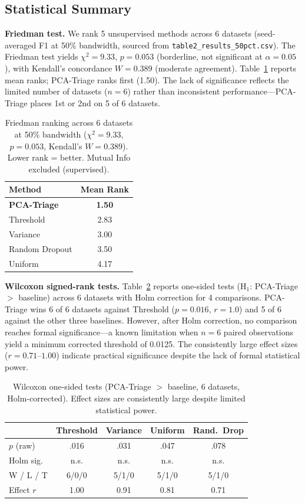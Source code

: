 \documentclass[journal]{IEEEtran}
\begin{document}
\subsection{Statistical Summary}

\textbf{Friedman test.} We rank 5 unsupervised methods across 6 datasets (seed-averaged F1 at 50\% bandwidth, sourced from \texttt{table2\_results\_50pct.csv}). The Friedman test yields $\chi^2 = 9.33$, $p = 0.053$ (borderline, not significant at $\alpha = 0.05$), with Kendall's concordance $W = 0.389$ (moderate agreement). Table~\ref{tab:statistical} reports mean ranks; PCA-Triage ranks first (1.50). The lack of significance reflects the limited number of datasets ($n = 6$) rather than inconsistent performance---PCA-Triage places 1st or 2nd on 5 of 6 datasets.

\begin{table}[t]
\centering
\caption{Friedman ranking across 6 datasets at 50\% bandwidth ($\chi^2 = 9.33$, $p = 0.053$, Kendall's $W = 0.389$). Lower rank = better. Mutual Info excluded (supervised).}
\begin{tabular}{@{}lc@{}}
\toprule
\textbf{Method} & \textbf{Mean Rank} \\
\midrule
\textbf{PCA-Triage} & \textbf{1.50} \\
Threshold & 2.83 \\
Variance & 3.00 \\
Random Dropout & 3.50 \\
Uniform & 4.17 \\
\bottomrule
\end{tabular}
\label{tab:statistical}
\end{table}

\textbf{Wilcoxon signed-rank tests.} Table~\ref{tab:wilcoxon} reports one-sided tests (H$_1$: PCA-Triage $>$ baseline) across 6 datasets with Holm correction for 4 comparisons. PCA-Triage wins 6 of 6 datasets against Threshold ($p = 0.016$, $r = 1.0$) and 5 of 6 against the other three baselines. However, after Holm correction, no comparison reaches formal significance---a known limitation when $n = 6$ paired observations yield a minimum corrected threshold of 0.0125. The consistently large effect sizes ($r = 0.71$--$1.00$) indicate practical significance despite the lack of formal statistical power.

\begin{table}[t]
\centering
\caption{Wilcoxon one-sided tests (PCA-Triage $>$ baseline, 6 datasets, Holm-corrected). Effect sizes are consistently large despite limited statistical power.}
\begin{tabular}{@{}lcccc@{}}
\toprule
& \textbf{Threshold} & \textbf{Variance} & \textbf{Uniform} & \textbf{Rand.\ Drop} \\
\midrule
$p$ (raw) & .016 & .031 & .047 & .078 \\
Holm sig. & n.s. & n.s. & n.s. & n.s. \\
W / L / T & 6/0/0 & 5/1/0 & 5/1/0 & 5/1/0 \\
Effect $r$ & 1.00 & 0.91 & 0.81 & 0.71 \\
\bottomrule
\end{tabular}
\label{tab:wilcoxon}
\end{table}
\end{document}
